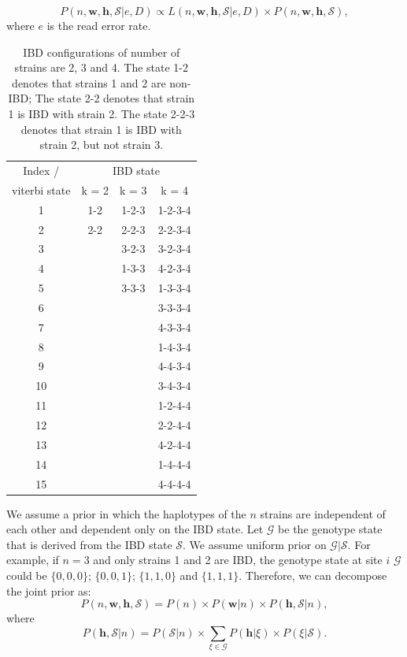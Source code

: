 \documentclass[9pt]{article}
\begin{document}
\begin{equation}
P(n, \mathbf{w}, \mathbf{h}, \mathcal{S}| e, D) \propto L(n, \mathbf{w}, \mathbf{h}, \mathcal{S} | e, D) \times P(n, \mathbf{w}, \mathbf{h}, \mathcal{S}), \label{eqn:post}
\end{equation}
where $e$ is the read error rate.

\begin{table}
\centering
\begin{tabular}{c|ccc}
  Index / & \multicolumn{3}{c}{IBD state} \\
viterbi state    & k = 2& k = 3 & k = 4 \\ \hline
1	  &1-2	&	1-2-3	&1-2-3-4	\\
2	  &2-2	&	2-2-3	&2-2-3-4	\\
3	  &	  	&	3-2-3	&3-2-3-4	\\
4	  &		  &	1-3-3	&4-2-3-4	\\
5	  &		  &	3-3-3	&1-3-3-4	\\
6	  &	  	&		    &3-3-3-4	\\
7	  &	  	&		    &4-3-3-4	\\
8	  &	  	&	    	&1-4-3-4	\\
9	  &	  	&		    &4-4-3-4	\\
10	&	  	&		    &3-4-3-4	\\
11	&	  	&		    &1-2-4-4	\\
12	&		  &		    &2-2-4-4	\\
13	&	  	&		    &4-2-4-4	\\
14	&	  	&	    	&1-4-4-4	\\
15	&	  	&		    &4-4-4-4	\\
\end{tabular}
\caption{IBD configurations of number of strains are 2, 3 and 4. The state 1-2 denotes that strains 1 and 2 are non-IBD; The state 2-2 denotes that strain 1 is IBD with strain 2. The state 2-2-3 denotes that strain 1 is IBD with strain 2, but not strain 3. }\label{tab:encode}
\end{table}


\noindent We assume a prior in which the haplotypes of the $n$ strains are independent of each other and dependent only on the IBD state. Let $\mathcal{G}$ be the genotype state that is derived from the IBD state $\mathcal{S}$. We assume uniform prior on $\mathcal{G}|\mathcal{S}$. For example, if $n=3$ and only strains 1 and 2 are IBD, the genotype state at site $i$ $\mathcal{G}$ could be $\{0,0,0\}$; $\{0,0,1\}$; $\{1,1,0\}$ and $\{1,1,1\}$. Therefore, we can decompose the joint prior as:
\begin{equation}
P(n, \mathbf{w}, \mathbf{h}, \mathcal{S}) = P(n) \times P(\mathbf{w}|n) \times P(\mathbf{h} , \mathcal{S}|n),
\end{equation}
where
\begin{equation}
P(\mathbf{h}, \mathcal{S}|n) = P(\mathcal{S}|n) \times \sum_{\xi \in \mathcal{G}} P(\mathbf{h} | \xi) \times P(\xi|\mathcal{S}).
\label{eqn:}
\end{equation}
\end{document}
